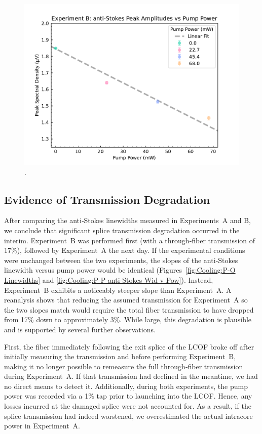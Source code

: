 \begin{figure}[t]
  \centering
  \includegraphics[width=\textwidth]{figs/3-Cooling/P-P anti-Stokes Height v Pow.pdf}
  \caption{.}
  \label{fig:Cooling:P-P anti-Stokes Height v Pow}
\end{figure}

\subsection{Evidence of Transmission Degradation}
\label{Cooling:subsec:Evidence of Transmission Degradation}

After comparing the anti‐Stokes linewidths measured in Experiments~A and B, we conclude that significant splice transmission degradation occurred in the interim. Experiment~B was performed first (with a through‐fiber transmission of 17\%), followed by Experiment~A the next day. If the experimental conditions were unchanged between the two experiments, the slopes of the anti‐Stokes linewidth versus pump power would be identical (Figures~\ref{fig:Cooling:P-O Linewidths} and \ref{fig:Cooling:P-P anti-Stokes Wid v Pow}). Instead, Experiment~B exhibits a noticeably steeper slope than Experiment~A. A reanalysis shows that reducing the assumed transmission for Experiment~A so the two slopes match would require the total fiber transmission to have dropped from 17\% down to approximately 3\%. While large, this degradation is plausible and is supported by several further observations.

First, the fiber immediately following the exit splice of the \ac{LCOF} broke off after initially measuring the transmission and before performing Experiment~B, making it no longer possible to remeasure the full through‐fiber transmission during Experiment~A. If that transmission had declined in the meantime, we had no direct means to detect it. Additionally, during both experiments, the pump power was recorded via a 1\% tap prior to launching into the \ac{LCOF}. Hence, any losses incurred at the damaged splice were not accounted for. As a result, if the splice transmission had indeed worstened, we overestimated the actual intracore power in Experiment~A.

